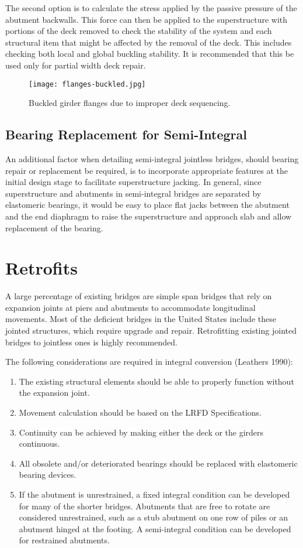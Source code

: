 The second option is to calculate the stress applied by the passive pressure of the abutment backwalls. This force
can then be applied to the superstructure with portions of the deck removed to check the stability of the system and
each structural item that might be affected by the removal of the deck. This includes checking both local and global
buckling stability. It is recommended that this be used only for partial width deck repair.

\begin{figure}
  \texttt{[image: flanges-buckled.jpg]}
  \caption{Buckled girder flanges due to improper deck sequencing.}
  \label{fig:flanges-buckled}
\end{figure}

\subsection{Bearing Replacement for Semi-Integral}
An additional factor when detailing semi-integral jointless bridges, should bearing repair or replacement be
required, is to incorporate appropriate features at the initial design stage to facilitate superstructure jacking. In general,
since superstructure and abutments in semi-integral bridges are separated by elastomeric bearings, it would be easy to
place flat jacks between the abutment and the end diaphragm to raise the superstructure and approach slab and allow
replacement of the bearing.

\section{Retrofits}
A large percentage of existing bridges are simple span bridges that rely on expansion joints at piers and abutments
to accommodate longitudinal movements. Most of the deficient bridges in the United States include these jointed
structures, which require upgrade and repair. Retrofitting existing jointed bridges to jointless ones is highly
recommended.

The following considerations are required in integral conversion (Leathers 1990):
\begin{enumerate}
  \item The existing structural elements should be able to properly function without the expansion joint.
  \item Movement calculation should be based on the LRFD Specifications.
  \item Continuity can be achieved by making either the deck or the girders continuous.
  \item All obsolete and/or deteriorated bearings should be replaced with elastomeric bearing devices.
  \item If the abutment is unrestrained, a fixed integral condition can be developed for many of the shorter bridges. Abutments that are free to rotate are considered unrestrained, such as a stub abutment on one row of piles or an abutment hinged at the footing. A semi-integral condition can be developed for restrained abutments.
\end{enumerate}


